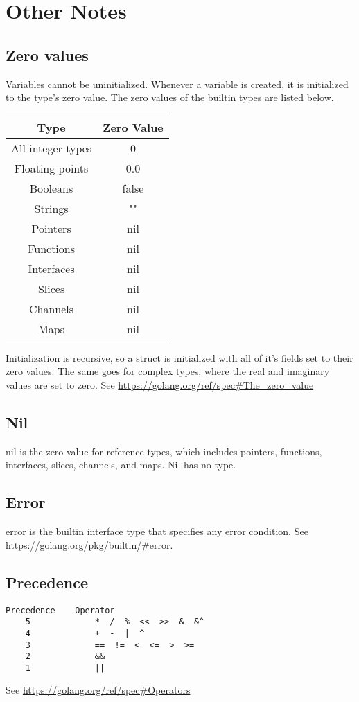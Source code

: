 \documentclass{article}
\begin{document}
\section{Other Notes}
	\subsection{Zero values}
		Variables cannot be uninitialized. Whenever a variable is created, it is initialized to the type's zero value. The zero values of the builtin types are listed below. 
		\begin{center}
			\begin{tabular}{ | c | c | }
			\hline
 			Type & Zero Value  \\ 
			\hline
 			All integer types & 0  \\  
 			Floating points & 0.0   \\
			Booleans & false \\
			Strings & "" \\
			Pointers & nil \\
			Functions & nil \\
			Interfaces & nil \\
			Slices & nil \\
			Channels & nil \\
			Maps & nil \\
			\hline
			\end{tabular}
		\end{center}
		Initialization is recursive, so a struct is initialized with all of it's fields set to their zero values. The same goes for complex types, where the real and imaginary values are set to zero.
		See \url{https://golang.org/ref/spec#The_zero_value}	
		
	\subsection{Nil}
	\colorbox{code}{nil} is the zero-value for reference types, which includes pointers, functions, interfaces, slices, channels, and maps. Nil has no type. 
		
	\subsection{Error}
	\colorbox{code}{error} is the builtin interface type that specifies any error condition. See \url{https://golang.org/pkg/builtin/#error}.
		
	\subsection{Precedence}
	\begin{verbatim}
Precedence    Operator
    5             *  /  %  <<  >>  &  &^
    4             +  -  |  ^
    3             ==  !=  <  <=  >  >=
    2             &&
    1             ||
	\end{verbatim}
	See \url{https://golang.org/ref/spec#Operators}
\end{document}
